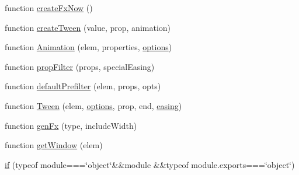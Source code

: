 \begin{DoxyCompactItemize}
\item 
function \hyperlink{obj_2_release_2_package_2_package_tmp_2_scripts_2jquery-1_810_82_8js_a3c7bcef859b0811abb1dbf890c6cc635}{create\+Fx\+Now} ()
\item 
function \hyperlink{obj_2_release_2_package_2_package_tmp_2_scripts_2jquery-1_810_82_8js_a0c2043fcd2fa684768877127fbbc2e55}{create\+Tween} (value, prop, animation)
\item 
function \hyperlink{obj_2_release_2_package_2_package_tmp_2_scripts_2jquery-1_810_82_8js_aa33f7dcb8ee41587d545a0bc69849296}{Animation} (elem, properties, \hyperlink{_scripts_2dropzone_8js_a601a442fa75a5a2657a41da857c71b55}{options})
\item 
function \hyperlink{obj_2_release_2_package_2_package_tmp_2_scripts_2jquery-1_810_82_8js_a0196d1f08ae60b747901b5a2950f72f1}{prop\+Filter} (props, special\+Easing)
\item 
function \hyperlink{obj_2_release_2_package_2_package_tmp_2_scripts_2jquery-1_810_82_8js_a8041b1040535dcee84ad474aaaf11dde}{default\+Prefilter} (elem, props, opts)
\item 
function \hyperlink{obj_2_release_2_package_2_package_tmp_2_scripts_2jquery-1_810_82_8js_adcb517ce3709049d37bb5f5bd3811edf}{Tween} (elem, \hyperlink{_scripts_2dropzone_8js_a601a442fa75a5a2657a41da857c71b55}{options}, prop, end, \hyperlink{_scripts_2jquery-1_810_82_8js_a9758a312629fa6de1744280dd6e6253b}{easing})
\item 
function \hyperlink{obj_2_release_2_package_2_package_tmp_2_scripts_2jquery-1_810_82_8js_a0dad9ae6c57fd32a071de202faa87081}{gen\+Fx} (type, include\+Width)
\item 
function \hyperlink{obj_2_release_2_package_2_package_tmp_2_scripts_2jquery-1_810_82_8js_ab8e6e1fb3b8b51b6afe437c63df0e09f}{get\+Window} (elem)
\item 
\hyperlink{obj_2_release_2_package_2_package_tmp_2_scripts_2jquery-1_810_82_8js_aa2cebb51f03a2e3ab2af45a3f9241c96}{if} (typeof module===\char`\"{}object\char`\"{}\&\&module \&\&typeof module.\+exports===\char`\"{}object\char`\"{})
\end{DoxyCompactItemize}
